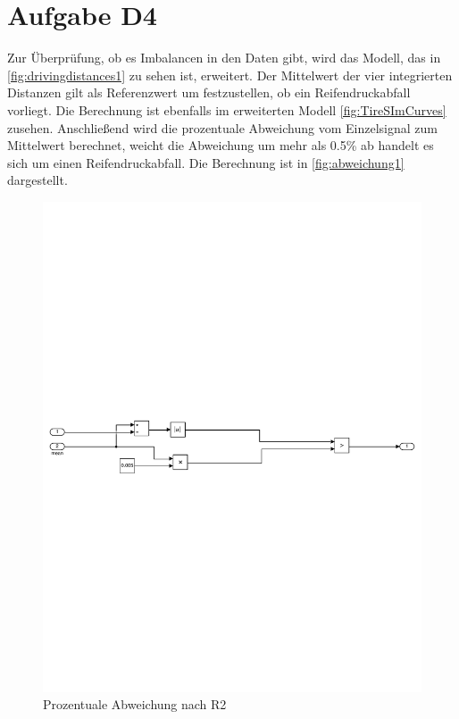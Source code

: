 \chapter{Aufgabe D4}

Zur Überprüfung, ob es Imbalancen in den Daten gibt, wird das Modell, das in \autoref{fig:drivingdistances1} zu sehen ist, erweitert.
Der Mittelwert der vier integrierten Distanzen gilt als Referenzwert um festzustellen, ob ein Reifendruckabfall vorliegt. Die Berechnung ist ebenfalls im erweiterten Modell \autoref{fig:TireSImCurves} zusehen. Anschließend wird die prozentuale Abweichung vom Einzelsignal zum Mittelwert berechnet, weicht die Abweichung um mehr als 0.5\% ab handelt es sich um einen Reifendruckabfall. Die Berechnung ist in \autoref{fig:abweichung1} dargestellt. 
\vspace{-1em}
\begin{figure}[H]
	\centering
	\includegraphics[width=1\linewidth]{../Graphiken/PDFSplit/3_PDFsam_SebastianTireSim2.pdf}
	\caption{Prozentuale Abweichung nach R2}
	\label{fig:abweichung1}
\end{figure}
